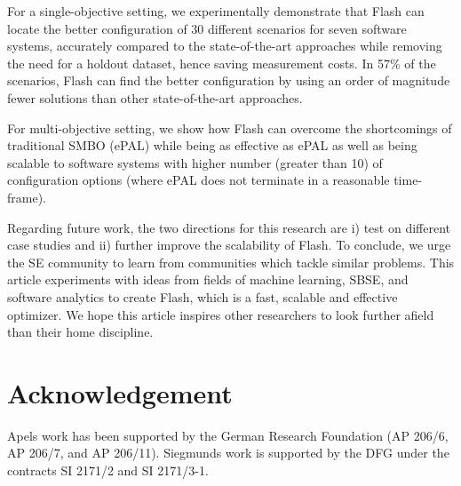 \documentclass[10pt,journal,compsoc]{IEEEtran}
\newcommand{\flash}{{\sc Flash}\xspace}
\begin{document}
For a single-objective setting, we experimentally demonstrate that \flash can locate the better configuration of 30 different scenarios for seven software systems, accurately compared to the state-of-the-art approaches while removing the need for a holdout dataset, hence saving measurement costs. In 57\% of the scenarios, \flash can find the better configuration by using an order of magnitude fewer solutions than other state-of-the-art approaches. 


For multi-objective setting, we show how \flash can overcome the shortcomings of traditional SMBO (ePAL) while being as effective as ePAL as well as being scalable to software systems with higher number (greater than 10) of configuration options (where ePAL does not terminate in a reasonable time-frame).


Regarding future work, the two directions for this research are i) test on different case studies and ii) further improve the scalability of \flash. To conclude, we urge the SE community to learn from communities which tackle similar problems. This article experiments with ideas from fields of machine learning, SBSE, and software analytics to create \flash, which is a fast, scalable and effective optimizer. We hope this article inspires other researchers to look further afield than their home discipline.

\section{Acknowledgement}
Apel\textquotesingle s work has been supported by the German Research Foundation (AP 206/6, AP 206/7, and AP 206/11). Siegmund\textquotesingle s work is supported by the DFG under the contracts SI 2171/2 and SI 2171/3-1.






% 


% 
% 
\vspace{2mm}
\end{document}
